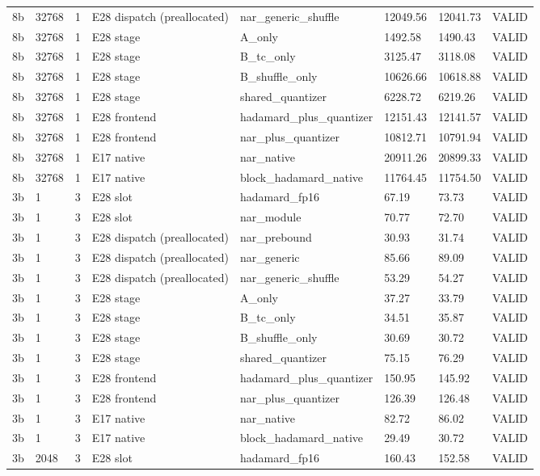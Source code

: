 {\begin{longtable}{llllllll}
8b & 32768 & 1 & E28 dispatch (preallocated) & nar\_generic\_shuffle & 12049.56 & 12041.73 & VALID \\
8b & 32768 & 1 & E28 stage & A\_only & 1492.58 & 1490.43 & VALID \\
8b & 32768 & 1 & E28 stage & B\_tc\_only & 3125.47 & 3118.08 & VALID \\
8b & 32768 & 1 & E28 stage & B\_shuffle\_only & 10626.66 & 10618.88 & VALID \\
8b & 32768 & 1 & E28 stage & shared\_quantizer & 6228.72 & 6219.26 & VALID \\
8b & 32768 & 1 & E28 frontend & hadamard\_plus\_quantizer & 12151.43 & 12141.57 & VALID \\
8b & 32768 & 1 & E28 frontend & nar\_plus\_quantizer & 10812.71 & 10791.94 & VALID \\
8b & 32768 & 1 & E17 native & nar\_native & 20911.26 & 20899.33 & VALID \\
8b & 32768 & 1 & E17 native & block\_hadamard\_native & 11764.45 & 11754.50 & VALID \\
3b & 1 & 3 & E28 slot & hadamard\_fp16 & 67.19 & 73.73 & VALID \\
3b & 1 & 3 & E28 slot & nar\_module & 70.77 & 72.70 & VALID \\
3b & 1 & 3 & E28 dispatch (preallocated) & nar\_prebound & 30.93 & 31.74 & VALID \\
3b & 1 & 3 & E28 dispatch (preallocated) & nar\_generic & 85.66 & 89.09 & VALID \\
3b & 1 & 3 & E28 dispatch (preallocated) & nar\_generic\_shuffle & 53.29 & 54.27 & VALID \\
3b & 1 & 3 & E28 stage & A\_only & 37.27 & 33.79 & VALID \\
3b & 1 & 3 & E28 stage & B\_tc\_only & 34.51 & 35.87 & VALID \\
3b & 1 & 3 & E28 stage & B\_shuffle\_only & 30.69 & 30.72 & VALID \\
3b & 1 & 3 & E28 stage & shared\_quantizer & 75.15 & 76.29 & VALID \\
3b & 1 & 3 & E28 frontend & hadamard\_plus\_quantizer & 150.95 & 145.92 & VALID \\
3b & 1 & 3 & E28 frontend & nar\_plus\_quantizer & 126.39 & 126.48 & VALID \\
3b & 1 & 3 & E17 native & nar\_native & 82.72 & 86.02 & VALID \\
3b & 1 & 3 & E17 native & block\_hadamard\_native & 29.49 & 30.72 & VALID \\
3b & 2048 & 3 & E28 slot & hadamard\_fp16 & 160.43 & 152.58 & VALID \\

\end{longtable}}
